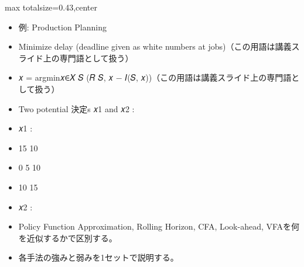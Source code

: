 \clearpage
{}
\begin{minipage}[t]{0.405\textwidth}
\begin{adjustbox}{max totalsize={\textwidth}{0.43\textheight},center}
\begin{minipage}{\textwidth}\scriptsize
{}\begin{itemize}
\item 例: Production Planning
\item Minimize delay (deadline given as white numbers at jobs)（この用語は講義スライド上の専門語として扱う）
\item 𝑥 = argmin𝑥∈𝑋 𝑆 (𝑅 𝑆, 𝑥 − 𝐼(𝑆, 𝑥))（この用語は講義スライド上の専門語として扱う）
\item Two potential 決定s 𝑥1 and 𝑥2 :
\item 𝑥1 :
\item 15 10
\item 0 5 10
\item 10 15
\item 𝑥2 :
\end{itemize}\begin{itemize}
\item Policy Function Approximation, Rolling Horizon, CFA, Look-ahead, VFAを何を近似するかで区別する。
\item 各手法の強みと弱みを1セットで説明する。
\end{itemize}
\end{minipage}
\end{adjustbox}
\end{minipage}\hfill
